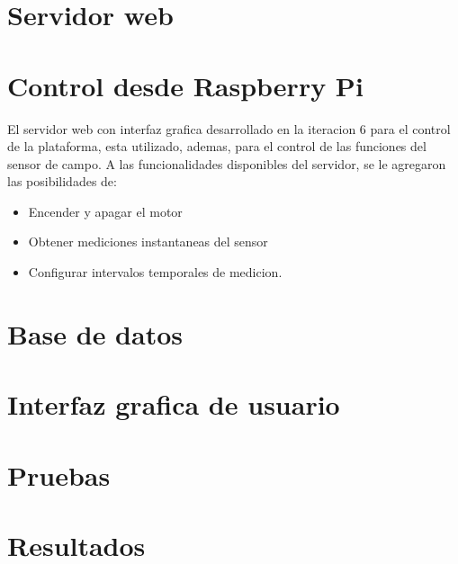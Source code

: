 
\section{Servidor web} %
\label{sec:servidor_web}



\section{Control desde Raspberry Pi} %
\label{it6:sub:control_desde_raspberry_pi}

El servidor web con interfaz grafica desarrollado en la iteracion 6 para el control de la plataforma, esta utilizado, ademas, para el control de las funciones del sensor de campo. A las funcionalidades disponibles del servidor, se le agregaron las posibilidades de:

\begin{itemize}
  \item Encender y apagar el motor
  \item Obtener mediciones instantaneas del sensor
  \item Configurar intervalos temporales de medicion. 
\end{itemize}



\section{Base de datos} %
\label{sec:base_de_datos}


\section{Interfaz grafica de usuario} %
\label{sec:interfaz_grafica_de_usuario}



\section{Pruebas} %
\label{sec:pruebas}


\section{Resultados} %
\label{sec:resultados}


